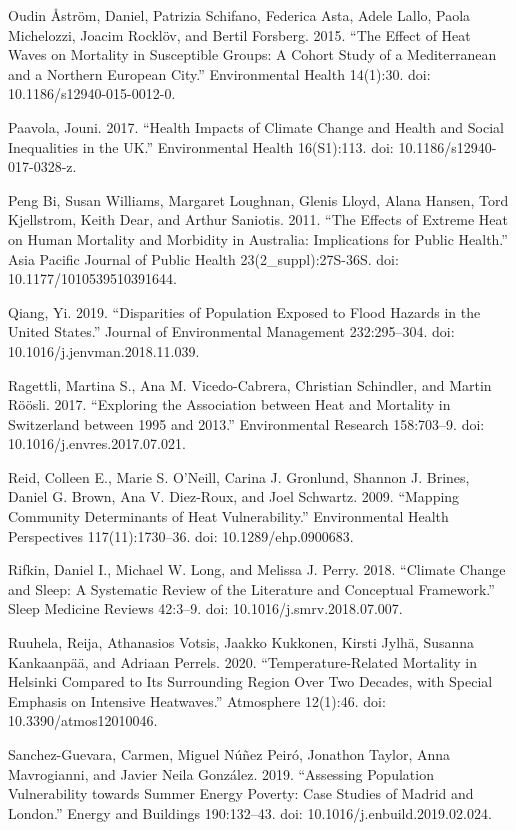 \documentclass[12pt]{article}
\begin{document}
Oudin Åström, Daniel, Patrizia Schifano, Federica Asta, Adele Lallo,
Paola Michelozzi, Joacim Rocklöv, and Bertil Forsberg. 2015. ``The
Effect of Heat Waves on Mortality in Susceptible Groups: A Cohort Study
of a Mediterranean and a Northern European City.'' Environmental Health
14(1):30. doi: 10.1186/s12940-015-0012-0.

Paavola, Jouni. 2017. ``Health Impacts of Climate Change and Health and
Social Inequalities in the UK.'' Environmental Health 16(S1):113. doi:
10.1186/s12940-017-0328-z.

Peng Bi, Susan Williams, Margaret Loughnan, Glenis Lloyd, Alana Hansen,
Tord Kjellstrom, Keith Dear, and Arthur Saniotis. 2011. ``The Effects of
Extreme Heat on Human Mortality and Morbidity in Australia: Implications
for Public Health.'' Asia Pacific Journal of Public Health
23(2\_suppl):27S-36S. doi: 10.1177/1010539510391644.

Qiang, Yi. 2019. ``Disparities of Population Exposed to Flood Hazards in
the United States.'' Journal of Environmental Management 232:295--304.
doi: 10.1016/j.jenvman.2018.11.039.

Ragettli, Martina S., Ana M. Vicedo-Cabrera, Christian Schindler, and
Martin Röösli. 2017. ``Exploring the Association between Heat and
Mortality in Switzerland between 1995 and 2013.'' Environmental Research
158:703--9. doi: 10.1016/j.envres.2017.07.021.

Reid, Colleen E., Marie S. O'Neill, Carina J. Gronlund, Shannon J.
Brines, Daniel G. Brown, Ana V. Diez-Roux, and Joel Schwartz. 2009.
``Mapping Community Determinants of Heat Vulnerability.'' Environmental
Health Perspectives 117(11):1730--36. doi: 10.1289/ehp.0900683.

Rifkin, Daniel I., Michael W. Long, and Melissa J. Perry. 2018.
``Climate Change and Sleep: A Systematic Review of the Literature and
Conceptual Framework.'' Sleep Medicine Reviews 42:3--9. doi:
10.1016/j.smrv.2018.07.007.

Ruuhela, Reija, Athanasios Votsis, Jaakko Kukkonen, Kirsti Jylhä,
Susanna Kankaanpää, and Adriaan Perrels. 2020. ``Temperature-Related
Mortality in Helsinki Compared to Its Surrounding Region Over Two
Decades, with Special Emphasis on Intensive Heatwaves.'' Atmosphere
12(1):46. doi: 10.3390/atmos12010046.

Sanchez-Guevara, Carmen, Miguel Núñez Peiró, Jonathon Taylor, Anna
Mavrogianni, and Javier Neila González. 2019. ``Assessing Population
Vulnerability towards Summer Energy Poverty: Case Studies of Madrid and
London.'' Energy and Buildings 190:132--43. doi:
10.1016/j.enbuild.2019.02.024.
\end{document}
